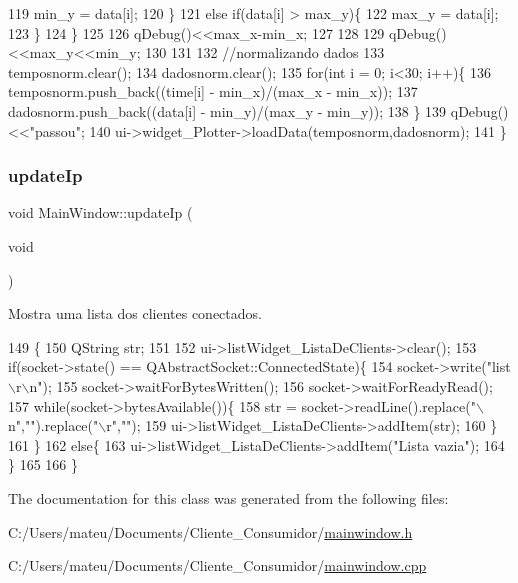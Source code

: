 \begin{DoxyCode}
119             min\_y = data[i];
120         \}
121         \textcolor{keywordflow}{else} \textcolor{keywordflow}{if}(data[i] > max\_y)\{
122             max\_y = data[i];
123         \}
124     \}
125 
126     qDebug()<<max\_x-min\_x;
127 
128 
129     qDebug()<<max\_y<<min\_y;
130 
131 
132     \textcolor{comment}{//normalizando dados}
133     temposnorm.clear();
134     dadosnorm.clear();
135     \textcolor{keywordflow}{for}(\textcolor{keywordtype}{int} i = 0; i<30; i++)\{
136         temposnorm.push\_back((time[i] - min\_x)/(max\_x - min\_x));
137         dadosnorm.push\_back((data[i] - min\_y)/(max\_y - min\_y));
138     \}
139     qDebug()<<\textcolor{stringliteral}{"passou"};
140     ui->widget\_Plotter->loadData(temposnorm,dadosnorm);
141 \}
\end{DoxyCode}
\mbox{\label{class_main_window_a6d5ab019a97676b4edfe7d4b6a541455}} 
\subsubsection{\texorpdfstring{update\+Ip}{updateIp}}
{\footnotesize\ttfamily void Main\+Window\+::update\+Ip (\begin{DoxyParamCaption}\item[{void}]{ }\end{DoxyParamCaption})\hspace{0.3cm}{\ttfamily [slot]}}



Mostra uma lista dos clientes conectados. 


\begin{DoxyCode}
149                              \{
150     QString str;
151 
152     ui->listWidget\_ListaDeClients->clear();
153     \textcolor{keywordflow}{if}(socket->state() == QAbstractSocket::ConnectedState)\{
154         socket->write(\textcolor{stringliteral}{"list\(\backslash\)r\(\backslash\)n"});
155         socket->waitForBytesWritten();
156         socket->waitForReadyRead();
157         \textcolor{keywordflow}{while}(socket->bytesAvailable())\{
158             str = socket->readLine().replace(\textcolor{stringliteral}{"\(\backslash\)n"},\textcolor{stringliteral}{""}).replace(\textcolor{stringliteral}{"\(\backslash\)r"},\textcolor{stringliteral}{""});
159             ui->listWidget\_ListaDeClients->addItem(str);
160         \}
161     \}
162     \textcolor{keywordflow}{else}\{
163         ui->listWidget\_ListaDeClients->addItem(\textcolor{stringliteral}{"Lista vazia"});
164     \}
165 
166 \}
\end{DoxyCode}


The documentation for this class was generated from the following files\+:\begin{DoxyCompactItemize}
\item 
C\+:/\+Users/mateu/\+Documents/\+Cliente\+\_\+\+Consumidor/\mbox{\hyperlink{mainwindow_8h}{mainwindow.\+h}}\item 
C\+:/\+Users/mateu/\+Documents/\+Cliente\+\_\+\+Consumidor/\mbox{\hyperlink{mainwindow_8cpp}{mainwindow.\+cpp}}\end{DoxyCompactItemize}
